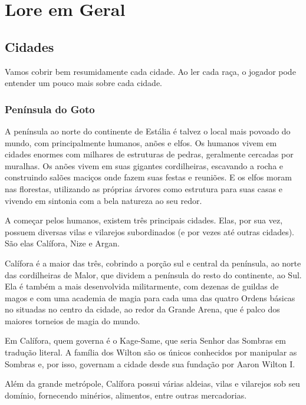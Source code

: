 \documentclass{RPG_Adventure}[2021/10/20]
\begin{document}
\chapter{Lore em Geral}%
\label{cha:lore_em_geral}
\begin{multicols}{2}

\section{Cidades}%

Vamos cobrir bem resumidamente cada cidade. Ao ler cada raça, o jogador pode
entender um pouco mais sobre cada cidade.

\subsection{Península do Goto}%

A península ao norte do continente de Estália é talvez o local mais povoado do
mundo, com principalmente humanos, anões e elfos. Os humanos vivem em cidades
enormes com milhares de estruturas de pedras, geralmente cercadas por muralhas.
Os anões vivem em suas gigantes cordilheiras, escavando a rocha e construindo
salões maciços onde fazem suas festas e reuniões. E os elfos moram nas
florestas, utilizando as próprias árvores como estrutura para suas casas e
vivendo em sintonia com a bela natureza ao seu redor.

A começar pelos humanos, existem três principais cidades. Elas, por sua vez,
possuem diversas vilas e vilarejos subordinados (e por vezes até outras
cidades). São elas Calífora, Nize e Argan.

Calífora é a maior das três, cobrindo a porção sul e central da península, ao
norte das cordilheiras de Malor, que dividem a península do resto do continente,
ao Sul. Ela é também a mais desenvolvida militarmente, com dezenas de guildas
de magos e com uma academia de magia para cada uma das quatro Ordens básicas no
situadas no centro da cidade, ao redor da Grande Arena, que é palco dos maiores
torneios de magia do mundo.

Em Calífora, quem governa é o Kage-Same, que seria Senhor das Sombras em
tradução literal. A família dos Wilton são os únicos conhecidos por manipular as
Sombras e, por isso, governam a cidade desde sua fundação por Aaron Wilton I.

Além da grande metrópole, Calífora possui várias aldeias, vilas e vilarejos sob
seu domínio, fornecendo minérios, alimentos, entre outras mercadorias.


\end{multicols}
\end{document}
